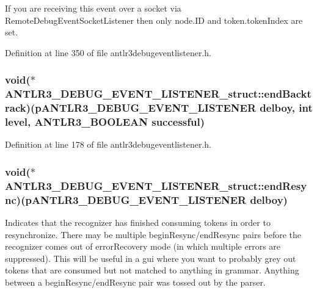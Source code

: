 If you are receiving this event over a socket via Remote\-Debug\-Event\-Socket\-Listener then only node.\-I\-D and token.\-token\-Index are set. 

Definition at line 350 of file antlr3debugeventlistener.\-h.

\hypertarget{struct_a_n_t_l_r3___d_e_b_u_g___e_v_e_n_t___l_i_s_t_e_n_e_r__struct_a651d4b204361bb951131408d817a0955}{
\subsubsection[{end\-Backtrack}]{\setlength{\rightskip}{0pt plus 5cm}void($\ast$ A\-N\-T\-L\-R3\-\_\-\-D\-E\-B\-U\-G\-\_\-\-E\-V\-E\-N\-T\-\_\-\-L\-I\-S\-T\-E\-N\-E\-R\-\_\-struct\-::end\-Backtrack)({\bf p\-A\-N\-T\-L\-R3\-\_\-\-D\-E\-B\-U\-G\-\_\-\-E\-V\-E\-N\-T\-\_\-\-L\-I\-S\-T\-E\-N\-E\-R} delboy, int {\bf level}, {\bf A\-N\-T\-L\-R3\-\_\-\-B\-O\-O\-L\-E\-A\-N} successful)}}\label{struct_a_n_t_l_r3___d_e_b_u_g___e_v_e_n_t___l_i_s_t_e_n_e_r__struct_a651d4b204361bb951131408d817a0955}


Definition at line 178 of file antlr3debugeventlistener.\-h.

\hypertarget{struct_a_n_t_l_r3___d_e_b_u_g___e_v_e_n_t___l_i_s_t_e_n_e_r__struct_a669726a9950721d30b320cdd534f1589}{
\subsubsection[{end\-Resync}]{\setlength{\rightskip}{0pt plus 5cm}void($\ast$ A\-N\-T\-L\-R3\-\_\-\-D\-E\-B\-U\-G\-\_\-\-E\-V\-E\-N\-T\-\_\-\-L\-I\-S\-T\-E\-N\-E\-R\-\_\-struct\-::end\-Resync)({\bf p\-A\-N\-T\-L\-R3\-\_\-\-D\-E\-B\-U\-G\-\_\-\-E\-V\-E\-N\-T\-\_\-\-L\-I\-S\-T\-E\-N\-E\-R} delboy)}}\label{struct_a_n_t_l_r3___d_e_b_u_g___e_v_e_n_t___l_i_s_t_e_n_e_r__struct_a669726a9950721d30b320cdd534f1589}
Indicates that the recognizer has finished consuming tokens in order to resynchronize. There may be multiple begin\-Resync/end\-Resync pairs before the recognizer comes out of error\-Recovery mode (in which multiple errors are suppressed). This will be useful in a gui where you want to probably grey out tokens that are consumed but not matched to anything in grammar. Anything between a begin\-Resync/end\-Resync pair was tossed out by the parser. 

